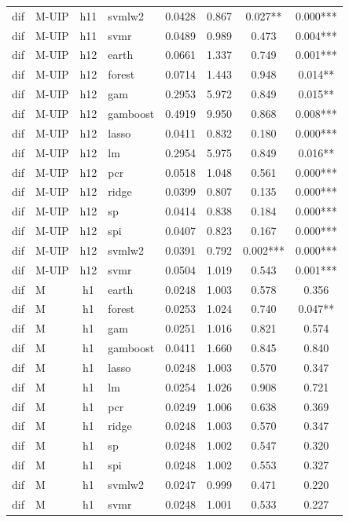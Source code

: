 \begin{ThreePartTable}
\begin{longtable}[t]{llclcccc}
dif & M-UIP & h11 & svmlw2 & 0.0428 & 0.867 & 0.027** & 0.000***\\
dif & M-UIP & h11 & svmr & 0.0489 & 0.989 & 0.473 & 0.004***\\
\addlinespace
dif & M-UIP & h12 & earth & 0.0661 & 1.337 & 0.749 & 0.001***\\
dif & M-UIP & h12 & forest & 0.0714 & 1.443 & 0.948 & 0.014**\\
dif & M-UIP & h12 & gam & 0.2953 & 5.972 & 0.849 & 0.015**\\
dif & M-UIP & h12 & gamboost & 0.4919 & 9.950 & 0.868 & 0.008***\\
dif & M-UIP & h12 & lasso & 0.0411 & 0.832 & 0.180 & 0.000***\\
dif & M-UIP & h12 & lm & 0.2954 & 5.975 & 0.849 & 0.016**\\
dif & M-UIP & h12 & pcr & 0.0518 & 1.048 & 0.561 & 0.000***\\
dif & M-UIP & h12 & ridge & 0.0399 & 0.807 & 0.135 & 0.000***\\
dif & M-UIP & h12 & sp & 0.0414 & 0.838 & 0.184 & 0.000***\\
dif & M-UIP & h12 & spi & 0.0407 & 0.823 & 0.167 & 0.000***\\
dif & M-UIP & h12 & svmlw2 & 0.0391 & 0.792 & 0.002*** & 0.000***\\
dif & M-UIP & h12 & svmr & 0.0504 & 1.019 & 0.543 & 0.001***\\
\addlinespace
dif & M & h1 & earth & 0.0248 & 1.003 & 0.578 & 0.356\\
dif & M & h1 & forest & 0.0253 & 1.024 & 0.740 & 0.047**\\
dif & M & h1 & gam & 0.0251 & 1.016 & 0.821 & 0.574\\
dif & M & h1 & gamboost & 0.0411 & 1.660 & 0.845 & 0.840\\
dif & M & h1 & lasso & 0.0248 & 1.003 & 0.570 & 0.347\\
dif & M & h1 & lm & 0.0254 & 1.026 & 0.908 & 0.721\\
dif & M & h1 & pcr & 0.0249 & 1.006 & 0.638 & 0.369\\
dif & M & h1 & ridge & 0.0248 & 1.003 & 0.570 & 0.347\\
dif & M & h1 & sp & 0.0248 & 1.002 & 0.547 & 0.320\\
dif & M & h1 & spi & 0.0248 & 1.002 & 0.553 & 0.327\\
dif & M & h1 & svmlw2 & 0.0247 & 0.999 & 0.471 & 0.220\\
dif & M & h1 & svmr & 0.0248 & 1.001 & 0.533 & 0.227\\

\end{longtable}
\end{ThreePartTable}
